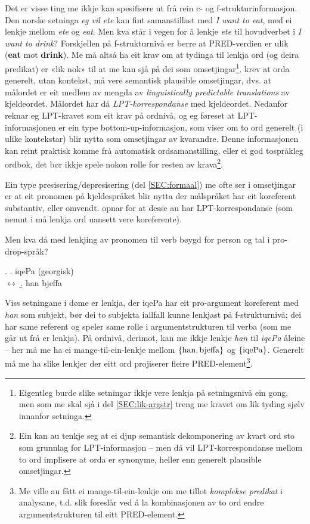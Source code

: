 \documentclass[11pt,a4paper,oneside,draft]{book}
\begin{document}
Det er visse ting me ikkje kan spesifisere ut frå rein c- og
f-strukturinformasjon. Den norske setninga \emph{eg vil ete} kan fint
samanstillast med \emph{I want to eat}, med ei lenkje mellom \emph{ete} og
\emph{eat}. Men kva står i vegen for å lenkje \emph{ete} til hovudverbet i \emph{I want to drink}? Forskjellen på f-strukturnivå er berre at PRED-verdien
er ulik (\textbf{eat} mot \textbf{drink}). Me må altså ha eit krav om at tydinga til
lenkja ord (og deira predikat) er «lik nok» til at me kan sjå på dei
som omsetjingar\footnote{Eigentleg burde slike setningar ikkje vere lenkja på
        setningsnivå ein gong, men som me skal sjå i del
        \ref{SEC:lik-argstr} treng me kravet om lik tyding 
        sjølv innanfor setninga. }. \citet[s.~74]{dyvik2009lmp} krev at orda
generelt, utan kontekst, må vere semantisk plausible omsetjingar,
dvs. at målordet er eit medlem av mengda av \emph{linguistically predictable translations} av kjeldeordet. Målordet har då
\emph{LPT-korrespondanse} med kjeldeordet.  Nedanfor reknar eg
LPT-kravet som eit krav på ordnivå, og eg føreset at LPT-informasjonen
er ein type bottom-up-informasjon, som viser om to ord generelt (i
ulike kontekstar) blir nytta som omsetjingar av kvarandre. Denne
informasjonen kan reint praktisk komme frå automatisk
ordsamanstilling, eller ei god tospråkleg ordbok, det bør ikkje spele
nokon rolle for resten av krava\footnote{Ein kan au tenkje seg at ei djup semantisk dekomponering av
        kvart ord sto som grunnlag for LPT-informasjon -- men då vil
        LPT-korrespondanse mellom to ord implisere at orda er
        synonyme, heller enn generelt plausible omsetjingar. }.

 
Ein type presisering/depresisering (del \ref{SEC:formaal}) me ofte ser
i omsetjingar er at eit pronomen på kjeldespråket blir nytta der
målspråket har eit koreferent substantiv, eller
omvendt. \citet{dyvik2009lmp} opnar for at desse au har
LPT-korrespondanse (som nemnt i \cite{thunes2003eal} må lenkja ord
uansett vere koreferente).

Men kva då med lenkjing av pronomen til verb bøygd for person og tal i
pro-drop-språk?

\ex. \a. iqePa                                  \hfill{} (georgisk) \\
     $\leftrightarrow$
     \b. han bjeffa

Viss setningane i døme \Last er lenkja, der iqePa har eit pro-argument
koreferent med \emph{han} som subjekt, bør dei to subjekta iallfall kunne
lenkjast på f-strukturnivå; dei har same referent og speler same rolle
i argumentstrukturen til verba (som me går ut frå er lenkja). På
ordnivå, derimot, kan me ikkje lenkje \emph{han} til \emph{iqePa} åleine -- her
må me ha ei mange-til-ein-lenkje mellom $\{ \rm han, bjeffa \}$ og $\{
\rm iqePa \}$. 
Generelt må me ha slike lenkjer der eitt ord projiserer fleire
PRED-element\footnote{Me ville au fått ei mange-til-ein-lenkje om me tillot
        \emph{komplekse predikat} i analysane, t.d. slik
        \citet{butt1998merger} foreslår ved å la kombinasjonen av to
        ord endre argumentstrukturen til eitt PRED-element. }.
\end{document}
